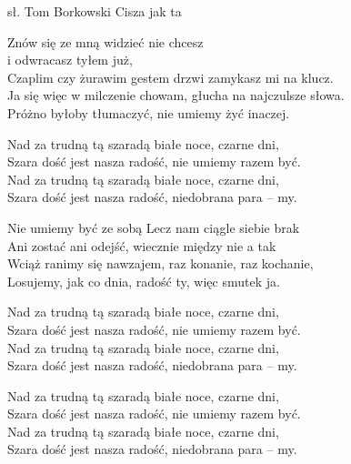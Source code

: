 {sł. Tom Borkowski}
{Cisza jak ta}
\begin{text}
\ifOneCol \else \footnotesize{ \fi
    \hfill\break
    \hfill\break
Znów się ze mną widzieć nie chcesz \ifOneCol \else \\ \vin \vin \vin \vin \fi i odwracasz tyłem już,\\
Czaplim czy żurawim gestem drzwi zamykasz mi na klucz.\\
Ja się więc w milczenie chowam, głucha na najczulsze słowa.\\
Próżno byłoby tłumaczyć, nie umiemy żyć inaczej.

    \OneColVin Nad za trudną tą szaradą białe noce, czarne dni,\\
    \OneColVin Szara dość jest nasza radość, nie umiemy razem być.\\
    \OneColVin Nad za trudną tą szaradą białe noce, czarne dni,\\
    \OneColVin Szara dość jest nasza radość, niedobrana para – my.

    \hfill\break
Nie umiemy być ze sobą Lecz nam ciągle siebie brak\\
Ani zostać ani odejść, wiecznie między nie a tak\\
Wciąż ranimy się nawzajem, raz konanie, raz kochanie,\\
Losujemy, jak co dnia, radość ty, więc smutek ja.

    \OneColVin Nad za trudną tą szaradą białe noce, czarne dni,\\
    \OneColVin Szara dość jest nasza radość, nie umiemy razem być.\\
    \OneColVin Nad za trudną tą szaradą białe noce, czarne dni,\\
    \OneColVin Szara dość jest nasza radość, niedobrana para – my.

    \hfill\break
    \OneColVin Nad za trudną tą szaradą białe noce, czarne dni,\\
    \OneColVin Szara dość jest nasza radość, nie umiemy razem być.\\
    \OneColVin Nad za trudną tą szaradą białe noce, czarne dni,\\
    \OneColVin Szara dość jest nasza radość, niedobrana para – my.
\ifOneCol \else } \fi
\end{text}
